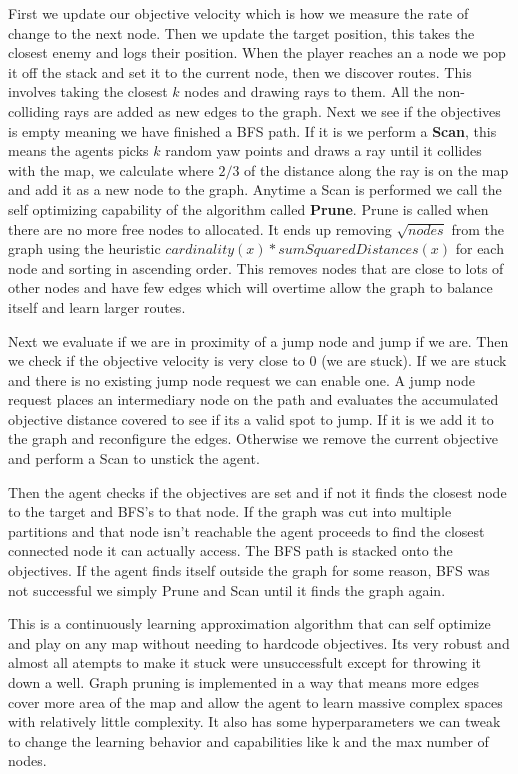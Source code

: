 \documentclass[11pt,a4paper]{article}
\begin{document}
First we update our objective velocity which is how we measure the rate of change to the next node. Then we update the target position, this takes the closest enemy and logs their position. 
When the player reaches an a node we pop it off the stack and set it to the current node, then we discover routes. This involves taking the closest $k$ nodes and drawing rays to them. All the non-colliding rays are added as new edges to the graph. Next we see if the objectives is empty meaning we have finished a BFS path. If it is we perform a \textbf{Scan}, this means the agents picks $k$ random yaw points and draws a ray until it collides with the map, we calculate where $2/3$ of the distance along the ray is on the map and add it as a new node to the graph. Anytime a Scan is performed we call the self optimizing capability of the algorithm called \textbf{Prune}. Prune is called when there are no more free nodes to allocated. It ends up removing $\sqrt{nodes}$ from the graph using the heuristic $cardinality(x)*sumSquaredDistances(x)$ for each node and sorting in ascending order. This removes nodes that are close to lots of other nodes and have few edges which will overtime allow the graph to balance itself and learn larger routes.

Next we evaluate if we are in proximity of a jump node and jump if we are. Then we check if the objective velocity is very close to 0 (we are stuck). If we are stuck and there is no existing jump node  request we can enable one. A jump node request places an intermediary node on the path and evaluates the accumulated objective distance covered to see if its a valid spot to jump. If it is we add it to the graph and reconfigure the edges. Otherwise we remove the current objective and perform a Scan to unstick the agent.

Then the agent checks if the objectives are set and if not it finds the closest node to the target and BFS's to that node. If the graph was cut into multiple partitions and that node isn't reachable the agent proceeds to find the closest connected node it can actually access. The BFS path is stacked onto the objectives. If the agent finds itself outside the graph for some reason, BFS was not successful we simply Prune and Scan until it finds the graph again.

This is a continuously learning approximation algorithm that can self optimize and play on any map without needing to hardcode objectives. Its very robust and almost all atempts to make it stuck were unsuccessfult except for throwing it down a well. Graph pruning is implemented in a way that means more edges cover more area of the map and allow the agent to learn massive complex spaces with relatively little complexity. It also has some hyperparameters we can tweak to change the learning behavior and capabilities like k and the max number of nodes.
\end{document}
